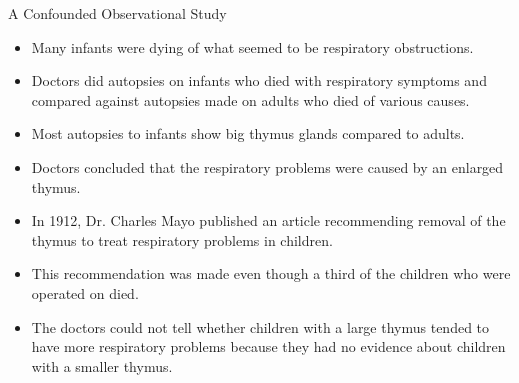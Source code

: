 \documentclass[handout]{beamer}
\begin{document}
\begin{frame}{A Confounded Observational Study}
\scriptsize{

\begin{itemize}

 \item Many infants were dying of what seemed to be respiratory obstructions.
 
 \item Doctors did autopsies on infants who died with respiratory symptoms and compared against autopsies made on adults who died of various causes.

\item Most autopsies to infants show big thymus glands compared to adults.

\item Doctors concluded that the respiratory problems were caused by an enlarged thymus. 


\item In 1912, Dr. Charles Mayo published an article recommending removal of the thymus to treat respiratory problems in children. 

\item This recommendation was made even though a third of the
children who were operated on died. 
  
\item The doctors could not tell whether children with a large thymus tended to have more respiratory problems because they had no evidence about children with a smaller thymus.  
  
\end{itemize}



} 
\end{frame}
\end{document}
